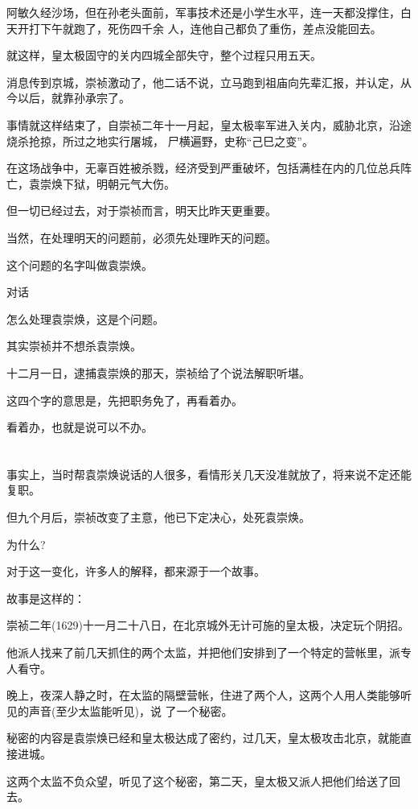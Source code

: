 \documentclass[11pt,a4paper,onecolumn]{article}
\begin{document}
阿敏久经沙场，但在孙老头面前，军事技术还是小学生水平，连一天都没撑住，白天开打下午就跑了，死伤四千余
人，连他自己都负了重伤，差点没能回去。

就这样，皇太极固守的关内四城全部失守，整个过程只用五天。

消息传到京城，崇祯激动了，他二话不说，立马跑到祖庙向先辈汇报，并认定，从今以后，就靠孙承宗了。

事情就这样结束了，自崇祯二年十一月起，皇太极率军进入关内，威胁北京，沿途烧杀抢掠，所过之地实行屠城，
尸横遍野，史称``己巳之变''。

在这场战争中，无辜百姓被杀戮，经济受到严重破坏，包括满桂在内的几位总兵阵亡，袁崇焕下狱，明朝元气大伤。

但一切已经过去，对于崇祯而言，明天比昨天更重要。

当然，在处理明天的问题前，必须先处理昨天的问题。

这个问题的名字叫做袁崇焕。

对话

怎么处理袁崇焕，这是个问题。

其实崇祯并不想杀袁崇焕。

十二月一日，逮捕袁崇焕的那天，崇祯给了个说法\myrule 解职听堪。

这四个字的意思是，先把职务免了，再看着办。

看着办，也就是说可以不办。

\section[\thesection]{}

事实上，当时帮袁崇焕说话的人很多，看情形关几天没准就放了，将来说不定还能复职。

但九个月后，崇祯改变了主意，他已下定决心，处死袁崇焕。

为什么?

对于这一变化，许多人的解释，都来源于一个故事。

故事是这样的：

崇祯二年(1629)十一月二十八日，在北京城外无计可施的皇太极，决定玩个阴招。

他派人找来了前几天抓住的两个太监，并把他们安排到了一个特定的营帐里，派专人看守。

晚上，夜深人静之时，在太监的隔壁营帐，住进了两个人，这两个人用人类能够听见的声音(至少太监能听见)，说
了一个秘密。

秘密的内容是袁崇焕已经和皇太极达成了密约，过几天，皇太极攻击北京，就能直接进城。

这两个太监不负众望，听见了这个秘密，第二天，皇太极又派人把他们给送了回去。
\end{document}
